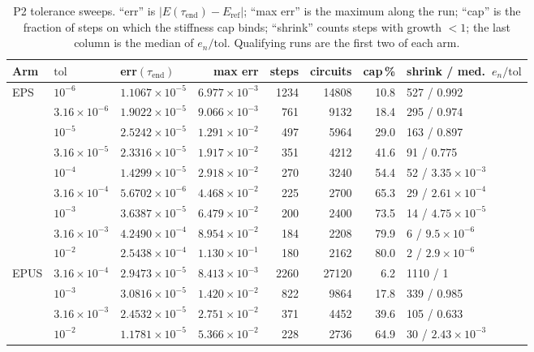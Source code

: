 \documentclass[aps,pra,reprint,superscriptaddress,nofootinbib]{revtex4-2}
\newcommand{\tol}{\mathrm{tol}}
\begin{document}
\begin{table}[t]
\caption{P2 tolerance sweeps. ``err'' is $|E(\tau_{\mathrm{end}})-E_{\mathrm{ref}}|$; ``max err''
is the maximum along the run; ``cap'' is the fraction of steps on which the stiffness cap binds;
``shrink'' counts steps with growth $<1$; the last column is the median of $e_n/\tol$.
Qualifying runs are the first two of each arm.}
\label{tab:p2}
\begin{ruledtabular}
\begin{tabular}{lllrrrrl}
Arm & $\tol$ & err$(\tau_{\mathrm{end}})$ & max err & steps & circuits & cap\,\% & shrink / med.\ $e_n/\tol$ \\
\midrule
EPS & $10^{-6}$ & $1.1067\times10^{-5}$ & $6.977\times10^{-3}$ & 1234 & 14808 & 10.8 & 527 / 0.992 \\
    & $3.16\times10^{-6}$ & $1.9022\times10^{-5}$ & $9.066\times10^{-3}$ & 761 & 9132 & 18.4 & 295 / 0.974 \\
    & $10^{-5}$ & $2.5242\times10^{-5}$ & $1.291\times10^{-2}$ & 497 & 5964 & 29.0 & 163 / 0.897 \\
    & $3.16\times10^{-5}$ & $2.3316\times10^{-5}$ & $1.917\times10^{-2}$ & 351 & 4212 & 41.6 & 91 / 0.775 \\
    & $10^{-4}$ & $1.4299\times10^{-5}$ & $2.918\times10^{-2}$ & 270 & 3240 & 54.4 & 52 / $3.35\times10^{-3}$ \\
    & $3.16\times10^{-4}$ & $5.6702\times10^{-6}$ & $4.468\times10^{-2}$ & 225 & 2700 & 65.3 & 29 / $2.61\times10^{-4}$ \\
    & $10^{-3}$ & $3.6387\times10^{-5}$ & $6.479\times10^{-2}$ & 200 & 2400 & 73.5 & 14 / $4.75\times10^{-5}$ \\
    & $3.16\times10^{-3}$ & $4.2490\times10^{-4}$ & $8.954\times10^{-2}$ & 184 & 2208 & 79.9 & 6 / $9.5\times10^{-6}$ \\
    & $10^{-2}$ & $2.5438\times10^{-4}$ & $1.130\times10^{-1}$ & 180 & 2162 & 80.0 & 2 / $2.9\times10^{-6}$ \\
\midrule
EPUS & $3.16\times10^{-4}$ & $2.9473\times10^{-5}$ & $8.413\times10^{-3}$ & 2260 & 27120 & 6.2 & 1110 / 1 \\
     & $10^{-3}$ & $3.0816\times10^{-5}$ & $1.420\times10^{-2}$ & 822 & 9864 & 17.8 & 339 / 0.985 \\
     & $3.16\times10^{-3}$ & $2.4532\times10^{-5}$ & $2.751\times10^{-2}$ & 371 & 4452 & 39.6 & 105 / 0.633 \\
     & $10^{-2}$ & $1.1781\times10^{-5}$ & $5.366\times10^{-2}$ & 228 & 2736 & 64.9 & 30 / $2.43\times10^{-3}$ \\

\end{tabular}
\end{ruledtabular}
\end{table}
\end{document}
